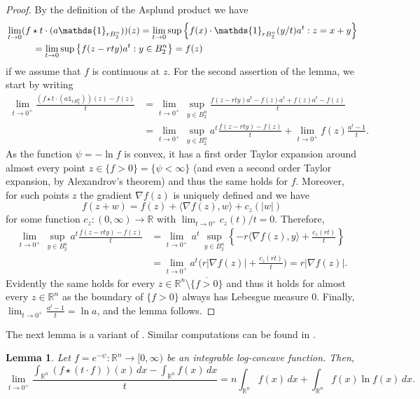 \documentclass[11pt,leqno]{article}
\newtheorem{lemma}[theorem]{Lemma}
\theoremstyle{definition}
\theoremstyle{remark}
\numberwithin{equation}{section}
\newcommand{\1}{\textbf{1}}
\newcommand{\R}{\mathbb{R}}
\begin{document}
\begin{proof}By the definition of the Asplund product we have
\begin{align*}&\lim_{t\to 0}(f\star t\cdot (a\mathds{1}_{rB_2^n}))(z)=\lim_{t\to 0}\sup\left\{f(x)\cdot \mathds{1}_{rB_2^n}(y/t)a^t:z=x+y\right\} \\
&\hspace*{1cm}=\lim_{t\to 0}\sup\left\{f(z-rty)a^t:y\in B_2^n\right\}=f(z)
\end{align*}
if we assume that $f$ is continuous at $z$. For the second assertion of the lemma, we start by writing
\begin{align*}
\lim_{t\to 0^+}\frac{(f\star t\cdot (a\mathds{1}_{rB_2^n}))(z)-f(z)}{t} &=\lim_{t\to 0^+}\,\sup_{y\in B_2^n}\frac{f(z-rty)a^t-f(z)a^t+f(z)a^t-f(z)}{t}\\
&=\lim_{t\to 0^+}\,\sup_{y\in B_2^n}a^t\frac{f(z-rty)-f(z)}{t}+\lim_{t\to 0^+}f(z)\frac{a^t-1}{t}.
\end{align*}
As the function $\psi=-\ln f$ is convex, it has a first order Taylor expansion around almost every point $z\in \{f>0\}=\{\psi<\infty\}$ (and even a second order Taylor expansion, by Alexandrov's theorem) and thus the same holds for $f$. Moreover, for such points $z$ the gradient $\nabla f(z)$ is uniquely defined and we have
$$f(z+w) = f(z) + \langle \nabla f(z), w\rangle + c_z(|w|)$$
for some function $c_z:(0,\infty)\to \R$ with $\lim_{t\to0^+} c_z(t)/t =0$. Therefore,
\begin{align*}
\lim_{t\to 0^+}\,\sup_{y\in B_2^n}a^t\frac{f(z-rty)-f(z)}{t} & = \lim_{t\to 0^+}\, a^t \, \sup_{y\in B_2^n} \left\{- r \langle \nabla f(z), y\rangle + \frac{c_z(rt)}{t} \right\}\\ & = \lim_{t\to0^+} a^t \Big( r|\nabla f(z)| + \frac{c_z(rt)}{t} \Big) = r|\nabla f(z)|.
\end{align*}
Evidently the same holds for every $z\in\R^n \setminus \overline{\{f>0\}}$ and thus it holds for almost every $z\in\R^n$ as the boundary of $\{f>0\}$ always has Lebesgue measure 0. Finally, $\lim_{t\to 0^+}\frac{a^t-1}{t}=\ln a$, and the lemma follows.
\end{proof}

The next lemma is a variant of \cite[Lemma~4.3]{Alonso-Gonzalez-Jimenez-Villa-2018}. Similar computations can be found in \cite{Colesanti-Fragala-2013}.

\begin{lemma}\label{lem:col-frag}Let $f=e^{-\psi}:\mathbb{R}^n\to [0,\infty)$ be an integrable log-concave function. Then,
$$\lim_{t\to 0^+}\frac{\int_{\mathbb{R}^n}(f\star (t\cdot f))(x)\,dx-\int_{\mathbb{R}^n}f(x)\,dx}{t}=n\int_{\mathbb{R}^n}f(x)\,dx +
\int_{\mathbb{R}^n}f(x)\ln f(x)\,dx.$$
\end{lemma}
\end{document}
